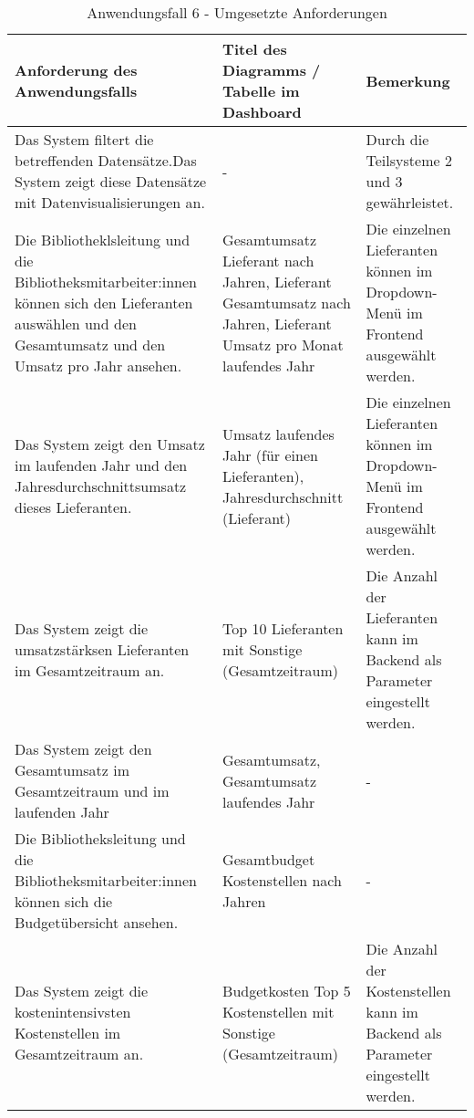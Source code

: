 \begingroup
    \setlength{\tabcolsep}{12pt} %
    \renewcommand{\arraystretch}{1.5} 
    \begin{table}[H]
        \centering
        \begin{adjustbox}{max width=\textwidth}
        \begin{tabular}{p{}p{}p{}}
           \toprule
           Anforderung des Anwendungsfalls        &Titel des Diagramms / Tabelle im Dashboard &Bemerkung\\
           \midrule
           Das System filtert die betreffenden Datensätze.Das System zeigt diese Datensätze mit Datenvisualisierungen an.&-&Durch die Teilsysteme 2 und 3 gewährleistet.\\
           Die Bibliotheklsleitung und die Bibliotheksmitarbeiter:innen können sich den Lieferanten auswählen und den Gesamtumsatz und den Umsatz pro Jahr ansehen.&Gesamtumsatz Lieferant nach Jahren, Lieferant Gesamtumsatz nach Jahren, Lieferant Umsatz pro Monat laufendes Jahr&Die einzelnen Lieferanten können im Dropdown-Menü im Frontend ausgewählt werden.\\
           Das System zeigt den Umsatz im laufenden Jahr und den Jahresdurchschnittsumsatz dieses Lieferanten.&Umsatz laufendes Jahr (für einen Lieferanten), Jahresdurchschnitt (Lieferant)&Die einzelnen Lieferanten können im Dropdown-Menü im Frontend ausgewählt werden.\\
           Das System zeigt die umsatzstärksen Lieferanten im Gesamtzeitraum an.&Top 10 Lieferanten mit Sonstige (Gesamtzeitraum) &Die Anzahl der Lieferanten kann im Backend als Parameter eingestellt werden.\\
           Das System zeigt den Gesamtumsatz im Gesamtzeitraum und im laufenden Jahr&Gesamtumsatz, Gesamtumsatz laufendes Jahr&-\\
           Die Bibliotheksleitung und die Bibliotheksmitarbeiter:innen können sich die Budgetübersicht ansehen.&Gesamtbudget Kostenstellen nach Jahren&-\\
           Das System zeigt die kostenintensivsten Kostenstellen im Gesamtzeitraum an.&Budgetkosten Top 5 Kostenstellen mit Sonstige (Gesamtzeitraum)&Die Anzahl der Kostenstellen kann im Backend als Parameter eingestellt werden.\\
        \bottomrule
        \end{tabular}
        \end{adjustbox}
        \caption{%
            Anwendungsfall 6 - Umgesetzte Anforderungen
        }
        \label{tab:Anwendungsfall 6 - Umgesetzte Anforderungen}
        \end{table}


